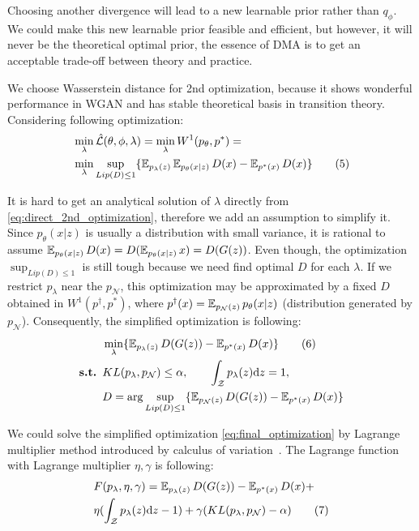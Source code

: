 Choosing another divergence will lead to a new learnable prior rather than $q_\phi$. We could make this new learnable prior feasible and efficient, but however, it will never be the theoretical optimal prior, \IE the essence of DMA is to get an acceptable trade-off between theory and practice. 

We choose Wasserstein distance for 2nd optimization, because it shows wonderful performance in WGAN and has stable theoretical basis in transition theory. Considering following optimization:
\begin{align*}\label{eq:direct_2nd_optimization}
	& \min_{\lambda} \hat{\mathcal{L}}(\theta, \phi, \lambda) = \min_{\lambda} W^1(p_\theta, p^*) = \\
	& \min_{\lambda} \sup_{Lip(D) \leq 1} \{\operatorname{\mathbb{E}}_{p_\lambda(z)} \operatorname{\mathbb{E}}_{p_\theta(x|z)} D(x)  - \operatorname{\mathbb{E}}_{p^*(x)} D(x)\} 
	\tag{5}
\end{align*}

It is hard to get an analytical solution of $\lambda$ directly from \cref{eq:direct_2nd_optimization}, therefore we add an assumption to simplify it. Since $p_\theta(x|z)$ is usually a distribution with small variance, it is rational to assume $\operatorname{\mathbb{E}}_{p_\theta(x|z)} D(x) = D(\operatorname{\mathbb{E}}_{p_\theta(x|z)} x) = D(G(z))$. Even though, the optimization $\sup_{Lip(D) \leq 1}$ is still tough because we need find optimal $D$ for each $\lambda$. If we restrict $p_\lambda$ near the $p_\mathcal{N}$, this optimization may be approximated by a fixed $D$ obtained in $W^1(p^\dag, p^*)$, where $p^\dag(x) = \operatorname{\mathbb{E}}_{p_\mathcal{N}(z)}p_\theta(x|z)$ (distribution generated by $p_\mathcal{N}$). Consequently, the simplified optimization is following:
\begin{align*}\label{eq:final_optimization}
	& \min_{\lambda} \{\operatorname{\mathbb{E}}_{p_\lambda(z)} D(G(z))  - \operatorname{\mathbb{E}}_{p^*(x)} D(x)\} \tag{6} \\
	{\textbf{s.t. }} & KL(p_\lambda, p_\mathcal{N}) \leq \alpha, \qquad \int_{\mathcal{Z}} p_\lambda(z) \mathrm{d} z = 1, \\
	& D = \arg \sup_{Lip(D) \leq 1} \{\operatorname{\mathbb{E}}_{p_\mathcal{N}(z)} D(G(z))  - \operatorname{\mathbb{E}}_{p^*(x)} D(x)\}
\end{align*}

We could solve the simplified optimization \cref{eq:final_optimization} by Lagrange multiplier method introduced by calculus of variation~\cite{gelfand2000calculus}. The Lagrange function with Lagrange multiplier $\eta, \gamma$ is following:
\begin{align*}\label{eq:lagrange_function}
& F(p_\lambda, \eta, \gamma) = \operatorname{\mathbb{E}}_{p_\lambda(z)} D(G(z))  - \operatorname{\mathbb{E}}_{p^*(x)} D(x) + \\
& \eta (\int_{\mathcal{Z}} p_\lambda(z) \mathrm{d} z - 1) + \gamma(KL(p_\lambda, p_\mathcal{N}) - \alpha) \tag{7}
\end{align*}

